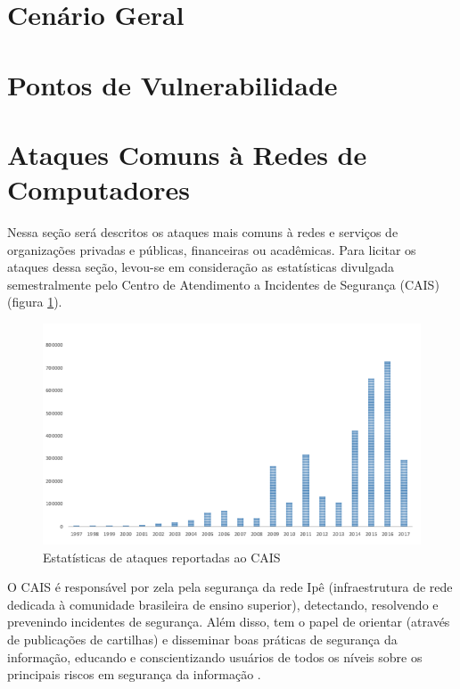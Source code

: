 \documentclass[
	12pt,				
	openright,		
	twoside,	
	a4paper,
	english,	
	brazil	
	]{abntex2}
\begin{document}
\section{Cenário Geral} \label{sec:geral}
\section{Pontos de Vulnerabilidade} \label{sec:vulnerabilidade}
\section{Ataques Comuns à Redes de Computadores} \label{sec:ataques}

Nessa seção será descritos os ataques mais comuns à redes e serviços de organizações privadas e públicas, financeiras ou acadêmicas. Para licitar os ataques dessa seção, levou-se em consideração as estatísticas divulgada semestralmente pelo Centro de Atendimento a Incidentes de Segurança (CAIS) (figura \ref{fig:cais}).

\begin{figure}[!htb]
 \centering
 \includegraphics[scale=.5]{incidentes_ano_14.png}
 \caption{Estatísticas de ataques reportadas ao CAIS}
 \label{fig:cais}
\end{figure}

O CAIS é responsável por zela pela segurança da rede Ipê (infraestrutura de rede dedicada à comunidade brasileira de ensino superior), detectando, resolvendo e prevenindo incidentes de segurança. Além disso, tem o papel de orientar (através de publicações de cartilhas) e disseminar boas práticas de segurança da informação, educando e conscientizando usuários de todos os níveis sobre os principais riscos em segurança da informação \cite{cais}.
\end{document}
